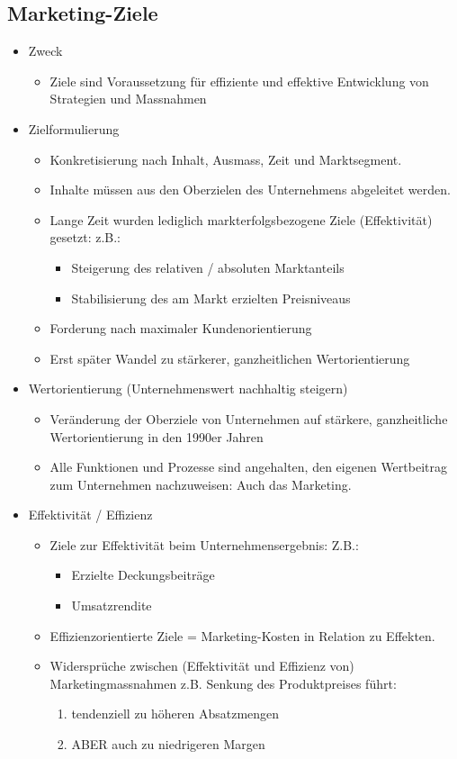 \subsection{Marketing-Ziele}
\begin{itemize}
	\item Zweck
	\begin{itemize}
		\item Ziele sind Voraussetzung für effiziente und effektive Entwicklung von Strategien und Massnahmen
	\end{itemize}
	\item Zielformulierung
	\begin{itemize}
		\item Konkretisierung nach Inhalt, Ausmass, Zeit und Marktsegment.
		\item Inhalte müssen aus den Oberzielen des Unternehmens abgeleitet	werden.
		\item Lange Zeit wurden lediglich markterfolgsbezogene Ziele (Effektivität)	gesetzt: z.B.:
		\begin{itemize}
			\item Steigerung des relativen / absoluten Marktanteils
			\item Stabilisierung des am Markt erzielten Preisniveaus
		\end{itemize}
		\item Forderung nach maximaler Kundenorientierung
		\item Erst später Wandel zu stärkerer, ganzheitlichen Wertorientierung
	\end{itemize}
	\item Wertorientierung (Unternehmenswert nachhaltig steigern)
	\begin{itemize}
		\item Veränderung der Oberziele von Unternehmen auf stärkere, ganzheitliche Wertorientierung in den 1990er Jahren
		\item Alle Funktionen und Prozesse sind angehalten, den eigenen Wertbeitrag zum Unternehmen nachzuweisen: Auch das Marketing.
	\end{itemize}
	\item Effektivität / Effizienz
	\begin{itemize}
		\item Ziele zur Effektivität beim Unternehmensergebnis: Z.B.:
		\begin{itemize}
			\item Erzielte Deckungsbeiträge
			\item Umsatzrendite
		\end{itemize}
		\item Effizienzorientierte Ziele = Marketing-Kosten in Relation zu Effekten.
		\item Widersprüche zwischen (Effektivität und Effizienz von) Marketingmassnahmen z.B. Senkung des Produktpreises führt:
		\begin{enumerate}
			\item tendenziell zu höheren Absatzmengen
			\item ABER auch zu niedrigeren Margen
		\end{enumerate}
	\end{itemize}
\end{itemize}

